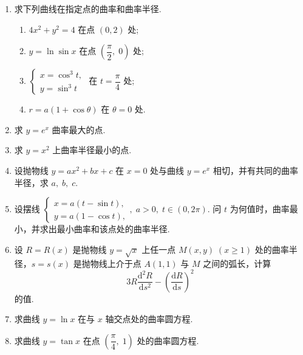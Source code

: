 \begin{enumerate}\setlength{\itemsep}{7pt}
    \item 求下列曲线在指定点的曲率和曲率半径.
    \begin{enumerate}[(1)]\setlength{\itemsep}{5pt}\setlength{\topsep}{15pt}
        \item $4x^2+y^2=4$ 在点 $(0,2)$ 处;
        \item $y=\ln\sin x$ 在点 $\left(\dfrac{\pi}{2},\;0\right)$ 处;
        \item $\begin{cases}
            x=\cos^3t,\\
            y=\sin^3t
        \end{cases}$ 在 $t=\dfrac{\pi}{4}$ 处;
        \item $r=a(1+\cos \theta)$ 在 $\theta=0$ 处.
    \end{enumerate}

    \item 求 $y=e^x$ 曲率最大的点. 
    
    \item 求 $y=x^2$ 上曲率半径最小的点.
    
    \item 设抛物线 $y=ax^2+bx+c$ 在 $x=0$ 处与曲线 $y=e^x$ 相切，并有共同的曲率半径，求 $a,\;b,\;c$.
    
    \item 设摆线 $\begin{cases}
        x=a(t-\sin t),\\
        y=a(1-\cos t),
    \end{cases},\;a>0,\;t\in(0,2\pi)$. 问 $t$ 为何值时，曲率最小，并求出最小曲率和该点处的曲率半径.

    \item 设 $R=R(x)$ 是抛物线  $y=\sqrt{x}$ 上任一点 $M(x, y)\;(x\geqslant 1)$ 处的曲率半径，$s=s(x)$ 是抛物线上介于点 $A(1,1)$ 与 $M$ 之间的弧长，计算
    \[
        3R\dfrac{\text{d}^2R}{\text{d}s^2}-\left(\dfrac{\text{d}R}{\text{d}s}\right)^2
    \]
    的值.

    \item 求曲线 $y=\ln x$ 在与 $x$ 轴交点处的曲率圆方程.
    
    \item 求曲线 $y=\tan x$ 在点 $\left(\dfrac{\pi}{4},\;1\right)$ 处的曲率圆方程.

\end{enumerate}